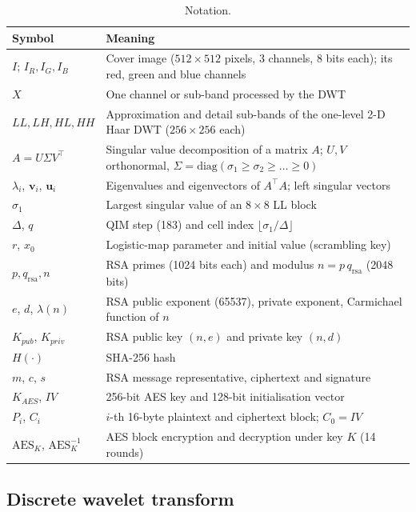 \documentclass[11pt,a4paper]{article}
\begin{document}
\begin{table}[!htbp]
\centering\small
\caption{Notation.}\label{tab:notation}
\begin{tabularx}{\textwidth}{@{}lX@{}}
\toprule
Symbol & Meaning \\
\midrule
$I$; $I_R, I_G, I_B$ & Cover image ($512\times512$ pixels, 3 channels, 8 bits each); its red, green and blue channels \\
$X$ & One channel or sub-band processed by the DWT \\
$LL, LH, HL, HH$ & Approximation and detail sub-bands of the one-level 2-D Haar DWT ($256\times256$ each) \\
$A = U\Sigma V^{\top}$ & Singular value decomposition of a matrix $A$; $U,V$ orthonormal, $\Sigma=\mathrm{diag}(\sigma_1\ge\sigma_2\ge\dots\ge0)$ \\
$\lambda_i$, $\mathbf{v}_i$, $\mathbf{u}_i$ & Eigenvalues and eigenvectors of $A^{\top}A$; left singular vectors \\
$\sigma_1$ & Largest singular value of an $8\times8$ LL block \\
$\Delta$, $q$ & QIM step (183) and cell index $\lfloor\sigma_1/\Delta\rfloor$ \\
$r$, $x_0$ & Logistic-map parameter and initial value (scrambling key) \\
$p, q_{\mathrm{rsa}}, n$ & RSA primes (1024 bits each) and modulus $n=p\,q_{\mathrm{rsa}}$ (2048 bits) \\
$e$, $d$, $\lambda(n)$ & RSA public exponent (65537), private exponent, Carmichael function of $n$ \\
$K_{pub}$, $K_{priv}$ & RSA public key $(n,e)$ and private key $(n,d)$ \\
$H(\cdot)$ & SHA-256 hash \\
$m$, $c$, $s$ & RSA message representative, ciphertext and signature \\
$K_{AES}$, $IV$ & 256-bit AES key and 128-bit initialisation vector \\
$P_i$, $C_i$ & $i$-th 16-byte plaintext and ciphertext block; $C_0 = IV$ \\
$\mathrm{AES}_K$, $\mathrm{AES}_K^{-1}$ & AES block encryption and decryption under key $K$ (14 rounds) \\
\bottomrule
\end{tabularx}
\end{table}

\subsection{Discrete wavelet transform}
\end{document}
